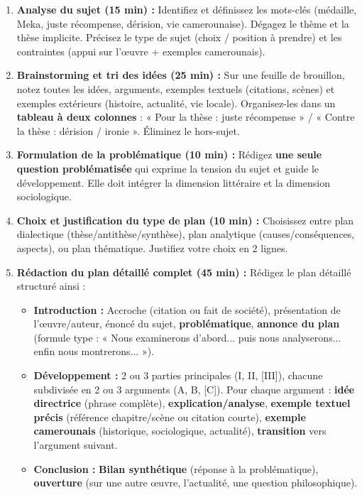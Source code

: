 \documentclass[11pt]{article}
\newcommand{\cle}[1]{{\popxbold\color{popdark}#1}}
\begin{document}
\begin{enumerate}
    \item \textbf{Analyse du sujet (15 min) :} Identifiez et définissez les \cle{mots-clés} (médaille, Meka, juste récompense, dérision, vie camerounaise). Dégagez le \cle{thème} et la \cle{thèse} implicite. Précisez le type de sujet (choix / position à prendre) et les contraintes (appui sur l'œuvre + exemples camerounais).
    \item \textbf{Brainstorming et tri des idées (25 min) :} Sur une feuille de brouillon, notez toutes les idées, arguments, exemples textuels (citations, scènes) et exemples extérieurs (histoire, actualité, vie locale). Organisez-les dans un \textbf{tableau à deux colonnes} : « Pour la thèse : juste récompense » / « Contre la thèse : dérision / ironie ». Éliminez le hors-sujet.
    \item \textbf{Formulation de la problématique (10 min) :} Rédigez \textbf{une seule question problématisée} qui exprime la tension du sujet et guide le développement. Elle doit intégrer la dimension littéraire et la dimension sociologique.
    \item \textbf{Choix et justification du type de plan (10 min) :} Choisissez entre plan dialectique (thèse/antithèse/synthèse), plan analytique (causes/conséquences, aspects), ou plan thématique. Justifiez votre choix en 2 lignes.
    \item \textbf{Rédaction du plan détaillé complet (45 min) :} Rédigez le plan détaillé structuré ainsi :
    \begin{itemize}
        \item \textbf{Introduction :} Accroche (citation ou fait de société), présentation de l'œuvre/auteur, énoncé du sujet, \textbf{problématique}, \textbf{annonce du plan} (formule type : « Nous examinerons d'abord... puis nous analyserons... enfin nous montrerons... »).
        \item \textbf{Développement :} 2 ou 3 parties principales (I, II, [III]), chacune subdivisée en 2 ou 3 arguments (A, B, [C]). Pour chaque argument : \textbf{idée directrice} (phrase complète), \textbf{explication/analyse}, \textbf{exemple textuel précis} (référence chapitre/scène ou citation courte), \textbf{exemple camerounais} (historique, sociologique, actualité), \textbf{transition} vers l'argument suivant.
        \item \textbf{Conclusion :} \textbf{Bilan synthétique} (réponse à la problématique), \textbf{ouverture} (sur une autre œuvre, l'actualité, une question philosophique).

\end{itemize}
\end{enumerate}
\end{document}
